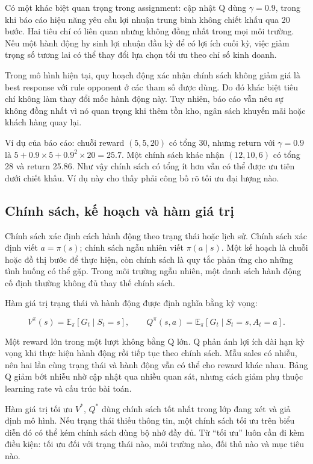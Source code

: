Có một khác biệt quan trọng trong assignment: cập nhật Q dùng
\(\gamma=0.9\), trong khi báo cáo hiệu năng yêu cầu lợi nhuận trung bình
không chiết khấu qua 20 bước. Hai tiêu chí có liên quan nhưng không đồng
nhất trong mọi môi trường. Nếu một hành động hy sinh lợi nhuận đầu kỳ để
có lợi ích cuối kỳ, việc giảm trọng số tương lai có thể thay đổi lựa
chọn tối ưu theo chỉ số kinh doanh.

Trong mô hình hiện tại, quy hoạch động xác nhận chính sách không giảm
giá là best response với rule opponent ở các tham số được dùng. Do đó
khác biệt tiêu chí không làm thay đổi mốc hành động này. Tuy nhiên, báo
cáo vẫn nêu sự không đồng nhất vì nó quan trọng khi thêm tồn kho, ngân
sách khuyến mãi hoặc khách hàng quay lại.

Ví dụ của báo cáo: chuỗi reward \((5,5,20)\) có tổng 30, nhưng return
với \(\gamma=0.9\) là \(5+0.9\times5+0.9^2\times20=25.7\). Một chính
sách khác nhận \((12,10,6)\) có tổng 28 và return 25.86. Như vậy chính
sách có tổng ít hơn vẫn có thể được ưu tiên dưới chiết khấu. Ví dụ này
cho thấy phải công bố rõ tối ưu đại lượng nào.

\subsection{Chính sách, kế hoạch và hàm giá
trị}\label{chuxednh-suxe1ch-kux1ebf-houx1ea1ch-vuxe0-huxe0m-giuxe1-trux1ecb}

Chính sách xác định cách hành động theo trạng thái hoặc lịch sử. Chính
sách xác định viết \(a=\pi(s)\); chính sách ngẫu nhiên viết
\(\pi(a\mid s)\). Một kế hoạch là chuỗi hoặc đồ thị bước để thực hiện,
còn chính sách là quy tắc phản ứng cho những tình huống có thể gặp.
Trong môi trường ngẫu nhiên, một danh sách hành động cố định thường
không đủ thay thế chính sách.

Hàm giá trị trạng thái và hành động được định nghĩa bằng kỳ vọng:

\[V^\pi(s)=\mathbb E_\pi[G_t\mid S_t=s],\qquad
Q^\pi(s,a)=\mathbb E_\pi[G_t\mid S_t=s,A_t=a].\]

Một reward lớn trong một lượt không bằng Q lớn. Q phản ánh lợi ích dài
hạn kỳ vọng khi thực hiện hành động rồi tiếp tục theo chính sách. Mẫu
sales có nhiễu, nên hai lần cùng trạng thái và hành động vẫn có thể cho
reward khác nhau. Bảng Q giảm bớt nhiễu nhờ cập nhật qua nhiều quan sát,
nhưng cách giảm phụ thuộc learning rate và cấu trúc bài toán.

Hàm giá trị tối ưu \(V^*\), \(Q^*\) dùng chính sách tốt nhất trong lớp
đang xét và giả định mô hình. Nếu trạng thái thiếu thông tin, một chính
sách tối ưu trên biểu diễn đó có thể kém chính sách dùng bộ nhớ đầy đủ.
Từ ``tối ưu'' luôn cần đi kèm điều kiện: tối ưu đối với trạng thái nào,
môi trường nào, đối thủ nào và mục tiêu nào.

